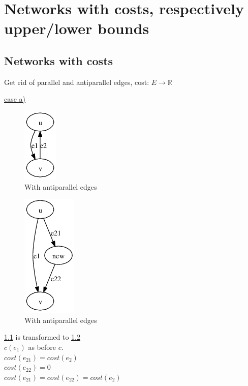 \chapter{Networks with costs, respectively upper/lower bounds}

\section{Networks with costs}

Get rid of parallel and antiparallel edges, cost: $E \rightarrow \mathbb{R}$ 

\begin{example}
\underline{case a)}\\

\begin{figure}[h]
\includegraphics[scale=0.45]{diagrams/graph5_1}
\caption{With antiparallel edges}
\label{G1}
\end{figure}

\begin{figure}[h]
\includegraphics[scale=0.45]{diagrams/graph5_2}
\caption{With antiparallel edges}
\label{G2}
\end{figure}

\ref{G1} is transformed to \ref{G2}
\\
$c(e{_1})$ as before $c$.\\
$cost(e{_21}) = cost(e{_2})$\\
$cost(e{_22}) = 0$\\
$cost(e{_21}) = cost(e{_22}) = cost(e{_2})$\\


\end{example}
